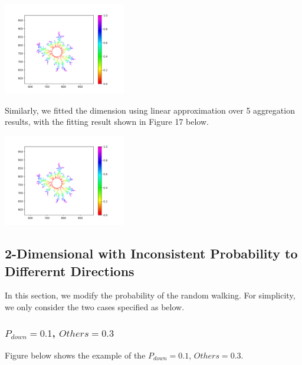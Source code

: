\documentclass[10pt]{article}
\begin{document}
\begin{center}
	\includegraphics[width=0.4\textwidth]{Figure_16}
\end{center}

Similarly, we fitted the dimension using linear approximation over 5 aggregation results, with the fitting result shown in Figure 17 below.

\begin{center}
	\includegraphics[width=0.4\textwidth]{Figure_16}
\end{center}


\subsection{2-Dimensional with Inconsistent Probability to Differernt Directions}

In this section, we modify the probability of the random walking. For simplicity, we only consider the two cases specified as below.

\subsubsection{$P_{down} = 0.1$, $Others = 0.3$}

Figure below shows the example of the $P_{down} = 0.1$, $Others = 0.3$.
\end{document}
